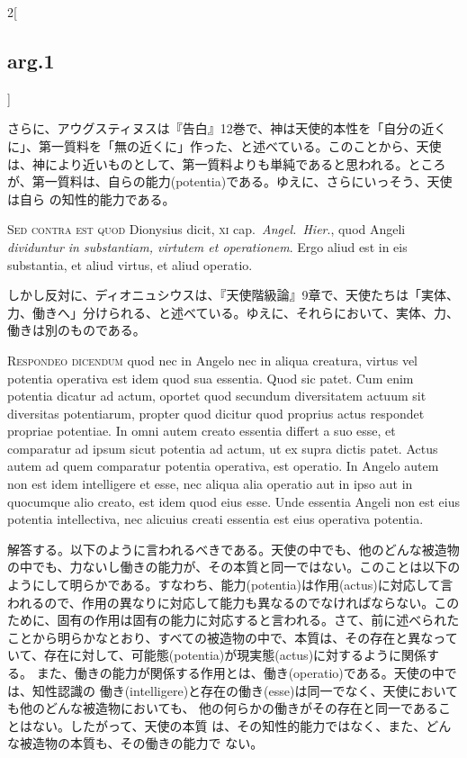 \documentclass[paper=a4paper,fontsize=10pt,jafontsize=9pt,titlepage]{jlreq}
\begin{document}
\begin{paracol}{2}[\subsection{arg.1}]
\switchcolumn

さらに、アウグスティヌスは『告白』12巻で、神は天使的本性を「自分の近く
 に」、第一質料を「無の近くに」作った、と述べている。このことから、天使
 は、神により近いものとして、第一質料よりも単純であると思われる。ところ
 が、第一質料は、自らの能力(potentia)である。ゆえに、さらにいっそう、天使は自ら
 の知性的能力である。

\switchcolumn*[\subsection{s.c.}]

{\scshape  Sed contra est quod} Dionysius dicit, {\scshape xi}
cap.~{\itshape Angel.~Hier}., quod Angeli {\itshape dividuntur in substantiam, virtutem et
operationem}. Ergo aliud est in eis substantia, et aliud virtus, et aliud
operatio.

\switchcolumn

しかし反対に、ディオニュシウスは、『天使階級論』9章で、天使たちは「実体、
 力、働きへ」分けられる、と述べている。ゆえに、それらにおいて、実体、力、
 働きは別のものである。


{\scshape Respondeo dicendum} quod nec in Angelo nec in
aliqua creatura, virtus vel potentia operativa est idem quod sua
essentia. Quod sic patet. Cum enim potentia dicatur ad actum, oportet
quod secundum diversitatem actuum sit diversitas potentiarum, propter
quod dicitur quod proprius actus respondet propriae potentiae. In omni
autem creato essentia differt a suo esse, et comparatur ad ipsum sicut
potentia ad actum, ut ex supra dictis patet. Actus autem ad quem
comparatur potentia operativa, est operatio. In Angelo autem non est
idem intelligere et esse, nec aliqua alia operatio aut in ipso aut in
quocumque alio creato, est idem quod eius esse. Unde essentia Angeli non
est eius potentia intellectiva, nec alicuius creati essentia est eius
operativa potentia.

\switchcolumn

解答する。以下のように言われるべきである。天使の中でも、他のどんな被造物
の中でも、力ないし働きの能力が、その本質と同一ではない。このことは以下の
ようにして明らかである。すなわち、能力(potentia)は作用(actus)に対応して言
われるので、作用の異なりに対応して能力も異なるのでなければならない。この
ために、固有の作用は固有の能力に対応すると言われる。さて、前に述べられた
ことから明らかなとおり、すべての被造物の中で、本質は、その存在と異なって
いて、存在に対して、可能態(potentia)が現実態(actus)に対するように関係する。
また、働きの能力が関係する作用とは、働き(operatio)である。天使の中では、知性認識の
働き(intelligere)と存在の働き(esse)は同一でなく、天使においても他のどんな被造物においても、
他の何らかの働きがその存在と同一であることはない。したがって、天使の本質
は、その知性的能力ではなく、また、どんな被造物の本質も、その働きの能力で
ない。


\end{paracol}
\end{document}
